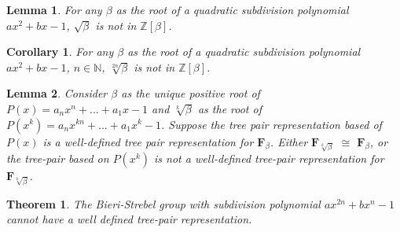 \documentclass[10pt,a4paper]{amsart}
\newtheorem{theorem}{Theorem}
\newtheorem{lemma}{Lemma}
\newtheorem{corollary}{Corollary}
\newcommand{\FN}[1]{$\textbf{F}_{#1}$}
\begin{document}
\begin{lemma}\label{rootexclude}
For any $\beta$ as the root of a quadratic subdivision polynomial $ax^2+bx-1$, $\sqrt{\beta}$ is not in $\mathbb{Z}[\beta]$.
\end{lemma}

\begin{corollary} \label{rootcor}
For any $\beta$ as the root of a quadratic subdivision polynomial $ax^2+bx-1$, $n \in \mathbb{N}$, $\sqrt[2n]{\beta}$ is not in $\mathbb{Z}[\beta]$.
\end{corollary}

\begin{lemma}\label{treepairdrop}
Consider $\beta$ as the unique positive root of $P(x) = a_n x^n +...+ a_1 x -1$ and $\sqrt[k]{\beta}$ as the root of $P(x^k) = a_n x^{kn} + ... + a_1 x^k -1$. Suppose the tree pair representation based of $P(x)$ is a well-defined tree pair representation for \FN{\beta}. Either \FN{\sqrt[k]{\beta}} $\cong$ \FN{\beta}, or the tree-pair based on $P(x^k)$ is not a well-defined tree-pair representation for \FN{\sqrt[k]{\beta}}. 
\end{lemma}

\begin{theorem}\label{roothm}
The Bieri-Strebel group with subdivision polynomial $ax^{2n}+bx^n-1$ cannot have a well defined tree-pair representation.
\end{theorem}
\end{document}
